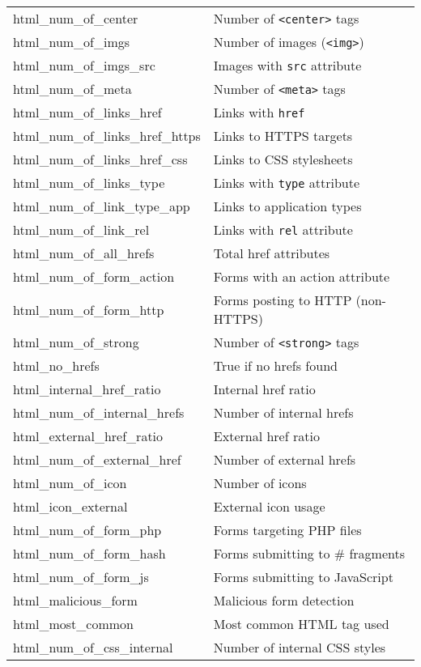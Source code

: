 \begin{longtable}{@{}ll@{}}
html\_num\_of\_center & Number of \texttt{<center>} tags \\
html\_num\_of\_imgs & Number of images (\texttt{<img>}) \\
html\_num\_of\_imgs\_src & Images with \texttt{src} attribute \\
html\_num\_of\_meta & Number of \texttt{<meta>} tags \\
html\_num\_of\_links\_href & Links with \texttt{href} \\
html\_num\_of\_links\_href\_https & Links to HTTPS targets \\
html\_num\_of\_links\_href\_css & Links to CSS stylesheets \\
html\_num\_of\_links\_type & Links with \texttt{type} attribute \\
html\_num\_of\_link\_type\_app & Links to application types \\
html\_num\_of\_link\_rel & Links with \texttt{rel} attribute \\
html\_num\_of\_all\_hrefs & Total href attributes \\
html\_num\_of\_form\_action & Forms with an action attribute \\
html\_num\_of\_form\_http & Forms posting to HTTP (non-HTTPS) \\
html\_num\_of\_strong & Number of \texttt{<strong>} tags \\
html\_no\_hrefs & True if no hrefs found \\
html\_internal\_href\_ratio & Internal href ratio \\
html\_num\_of\_internal\_hrefs & Number of internal hrefs \\
html\_external\_href\_ratio & External href ratio \\
html\_num\_of\_external\_href & Number of external hrefs \\
html\_num\_of\_icon & Number of icons \\
html\_icon\_external & External icon usage \\
html\_num\_of\_form\_php & Forms targeting PHP files \\
html\_num\_of\_form\_hash & Forms submitting to \# fragments \\
html\_num\_of\_form\_js & Forms submitting to JavaScript \\
html\_malicious\_form & Malicious form detection \\
html\_most\_common & Most common HTML tag used \\
html\_num\_of\_css\_internal & Number of internal CSS styles \\

\end{longtable}
